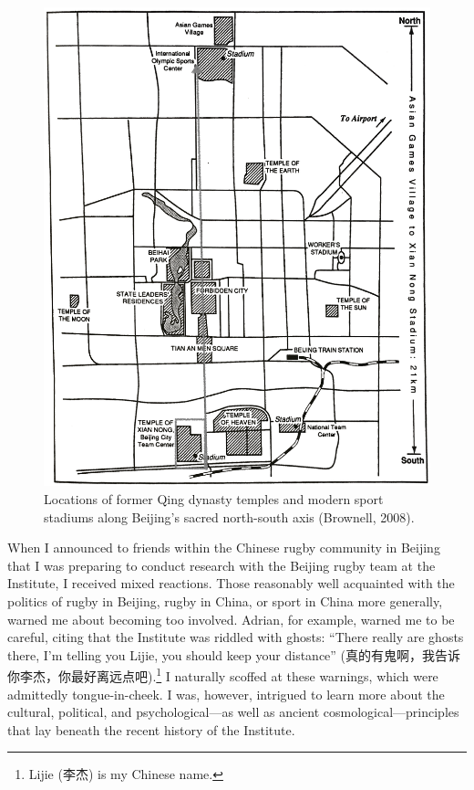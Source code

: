 \begin{CJK}{UTF8}{gbsn}
\begin{figure}[htbp]
    \centering
  \includegraphics[scale =.1]{images/beijingTemplesXNT.png}
  \caption{Locations of former Qing dynasty temples and modern sport stadiums along Beijing's sacred north-south axis (Brownell, 2008).}
  \label{fig:beijingTemplesXNT}
\end{figure}



When I announced to friends within the Chinese rugby community in Beijing that I was preparing to conduct research with the Beijing rugby team at the Institute, I received mixed reactions.  Those reasonably well acquainted with the politics of rugby in Beijing, rugby in China, or sport in China more generally, warned me about becoming too involved. Adrian, for example, warned me to be careful, citing that the Institute was riddled with ghosts: ``There really are ghosts there, I'm telling you Lijie, you should keep your distance'' (真的有鬼啊，我告诉你李杰，你最好离远点吧).\footnote{Lijie (李杰) is my Chinese name.}  I naturally scoffed at these warnings, which were admittedly tongue-in-cheek.  I was, however, intrigued to learn more about the cultural, political, and psychological---as well as ancient cosmological---principles that lay beneath the recent history of the Institute.


\end{CJK}
